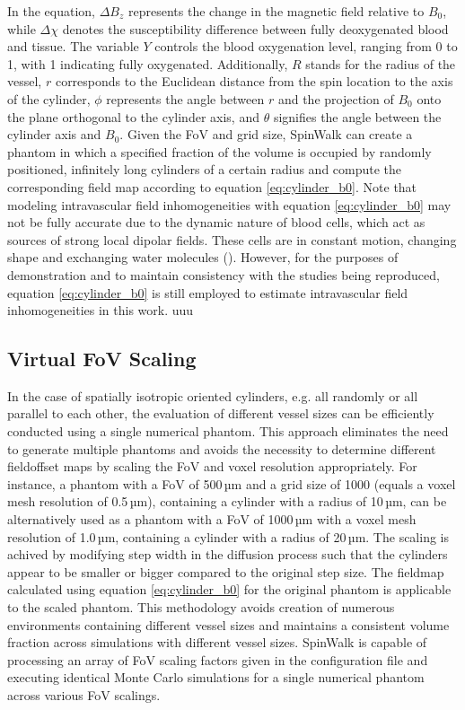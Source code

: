 In the equation, \(\Delta B_z\) represents the change in the magnetic field relative to \(B_0\), while \(\Delta\chi\) denotes the susceptibility difference between fully deoxygenated blood and tissue. The variable \(Y\) controls the blood oxygenation level, ranging from 0 to 1, with 1 indicating fully oxygenated. Additionally, \(R\) stands for the radius of the vessel, \(r\) corresponds to the Euclidean distance from the spin location to the axis of the cylinder, \(\phi\) represents the angle between \(r\) and the projection of \(B_0\) onto the plane orthogonal to the cylinder axis, and \(\theta\) signifies the angle between the cylinder axis and \(B_0\). Given the FoV and grid size, SpinWalk can create a phantom in which a specified fraction of the volume is occupied by randomly positioned, infinitely long cylinders of a certain radius and compute the corresponding field map according to equation \eqref{eq:cylinder_b0}. Note that modeling intravascular field inhomogeneities with equation \eqref{eq:cylinder_b0} may not be fully accurate due to the dynamic nature of blood cells, which act as sources of strong local dipolar fields. These cells are in constant motion, changing shape and exchanging water molecules (\cite{gagnon2016validation}). However, for the purposes of demonstration and to maintain consistency with the studies being reproduced, equation \eqref{eq:cylinder_b0} is still employed to estimate intravascular field inhomogeneities in this work.
uuu

\subsection*{Virtual FoV Scaling}
In the case of spatially isotropic oriented cylinders, e.g. all randomly or all parallel to each other, the evaluation of different vessel sizes can be efficiently conducted using a single numerical phantom. This approach eliminates the need to generate multiple phantoms and avoids the necessity to determine different fieldoffset maps by scaling the FoV and voxel resolution appropriately. For instance, a phantom with a FoV of 500\,µm and a grid size of 1000 (equals a voxel mesh resolution of 0.5\,µm), containing a cylinder with a radius of 10\,µm, can be alternatively used as a phantom with a FoV of 1000\,µm with a voxel mesh resolution of 1.0\,µm, containing a cylinder with a radius of 20\,µm. The scaling is achived by modifying step width in the diffusion process such that the cylinders appear to be smaller or bigger compared to the original step size. The fieldmap calculated using equation \eqref{eq:cylinder_b0} for the original phantom is applicable to the scaled phantom. This methodology avoids creation of numerous environments containing different vessel sizes and maintains a consistent volume fraction across simulations with different vessel sizes. SpinWalk is capable of processing an array of FoV scaling factors given in the configuration file and executing identical Monte Carlo simulations for a single numerical phantom across various FoV scalings. 

